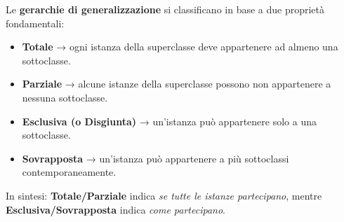 \begin{tcolorbox}[colback=yellow!15!white, colframe=orange!80!black, title=\textbf{Kristian semplifica in questo modo}]
Le \textbf{gerarchie di generalizzazione} si classificano in base a due proprietà fondamentali:

\begin{itemize}
    \item \textbf{Totale} → ogni istanza della superclasse deve appartenere ad almeno una sottoclasse.  
    \item \textbf{Parziale} → alcune istanze della superclasse possono non appartenere a nessuna sottoclasse.  
    \item \textbf{Esclusiva (o Disgiunta)} → un’istanza può appartenere solo a una sottoclasse.  
    \item \textbf{Sovrapposta} → un’istanza può appartenere a più sottoclassi contemporaneamente.
\end{itemize}

\noindent
In sintesi:  
\textbf{Totale/Parziale} indica \emph{se tutte le istanze partecipano},  
mentre \textbf{Esclusiva/Sovrapposta} indica \emph{come partecipano}.
\end{tcolorbox}
